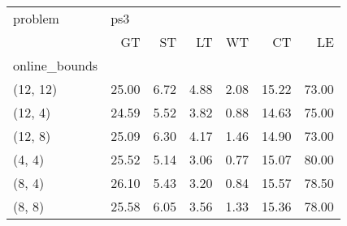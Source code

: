 \begin{tabular}{lrrrrrr}
\toprule
problem & \multicolumn{6}{l}{ps3} \\
{} &    GT &   ST &   LT &   WT &    CT &    LE \\
online\_bounds &       &      &      &      &       &       \\
\midrule
(12, 12)      & 25.00 & 6.72 & 4.88 & 2.08 & 15.22 & 73.00 \\
(12, 4)       & 24.59 & 5.52 & 3.82 & 0.88 & 14.63 & 75.00 \\
(12, 8)       & 25.09 & 6.30 & 4.17 & 1.46 & 14.90 & 73.00 \\
(4, 4)        & 25.52 & 5.14 & 3.06 & 0.77 & 15.07 & 80.00 \\
(8, 4)        & 26.10 & 5.43 & 3.20 & 0.84 & 15.57 & 78.50 \\
(8, 8)        & 25.58 & 6.05 & 3.56 & 1.33 & 15.36 & 78.00 \\
\bottomrule
\end{tabular}
